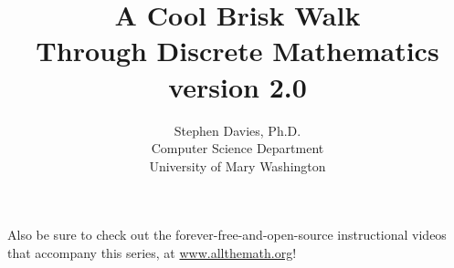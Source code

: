\documentclass[11pt]{memoir}
\begin{document}
\title{A Cool Brisk Walk\\Through Discrete Mathematics\\{\small version
2.0}}
\author{Stephen Davies, Ph.D.\\Computer Science Department\\University of Mary Washington}
\date{}
\maketitle


\frontmatter

\pagebreak

\renewcommand{\contentsname}{Contents at a glance}
\setcounter{tocdepth}{0}
\tableofcontents

\vspace{.6in}
\begin{center}
\small
Also be sure to check out the forever-free-and-open-source instructional videos
that accompany this series, at \url{www.allthemath.org}!
\end{center}




\mainmatter














\backmatter
\printindex
\end{document}
